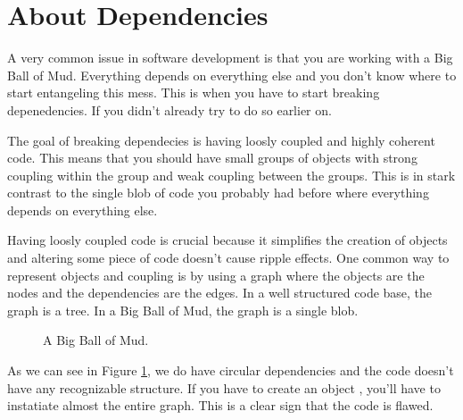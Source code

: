 \section{About Dependencies}

A very common issue in software development is that you are working with a Big Ball of Mud. Everything depends on everything else and you don't know where to start entangeling this mess. This is when you have to start breaking depenedencies. If you didn't already try to do so earlier on.

The goal of breaking dependecies is having loosly coupled and highly coherent code. This means that you should have small groups of objects with strong coupling within the group and weak coupling between the groups. This is in stark contrast to the single blob of code you probably had before where everything depends on everything else.

Having loosly coupled code is crucial because it simplifies the creation of objects and altering some piece of code doesn't cause ripple effects. One common way to represent objects and coupling is by using a graph where the objects are the nodes and the dependencies are the edges. In a well structured code base, the graph is a tree. In a Big Ball of Mud, the graph is a single blob.


\begin{figure}[h]
    \centering
    \caption{A Big Ball of Mud.}
    \label{fig:big_ball_of_mud}
\end{figure}

As we can see in Figure \ref{fig:big_ball_of_mud}, we do have circular dependencies and the code doesn't have any recognizable structure. If you have to create an object , you'll have to instatiate almost the entire graph. This is a clear sign that the code is flawed.

